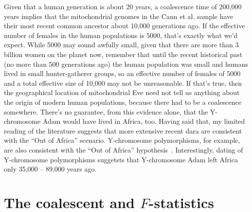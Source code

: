 \documentclass[12pt]{article}
\begin{document}
Given that a human generation is about 20 years, a coalescence time of
200,000 years implies that the mitochondrial genomes in the Cann et
al. sample have their most recent common ancestor about 10,000
generations ago. If the effective number of females in the human
populations is 5000, that's exactly what we'd expect. While 5000 may
sound awfully small, given that there are more than 3 billion women on
the planet now, remember that until the recent historical past (no
more than 500 generations ago) the human population was small and
humans lived in small hunter-gatherer groups, so an effective number
of females of 5000 and a total effective size of 10,000 may not be
unreasonable. If that's true, then the geographical location of
mitochondrial Eve need not tell us anything about the origin of modern
human populations, because there had to be a coalescence
somewhere. There's no guarantee, from this evidence alone, that the
Y-chromosome Adam would have lived in Africa, too. Having said that,
my limited reading of the literature suggests that more extensive
recent dara are consistent with the ``Out of Africa''
scenario. Y-chromosome polymorphisms, for example, are also consistent
with the ``Out of Africa''
hypothesis~\cite{Underhill-etal-2000}. Interestingly, dating of
Y-chromosome polymorphisms suggetsts that Y-chromosome Adam left
Africa only 35,000 -- 89,000 years ago.

\section*{The coalescent and $F$-statistics}
\end{document}
